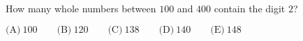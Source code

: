 

How many whole numbers between $100$ and $400$ contain the digit $2$?

$\text{(A)}\ 100 \qquad \text{(B)}\ 120 \qquad \text{(C)}\ 138 \qquad \text{(D)}\ 140 \qquad \text{(E)}\ 148$
